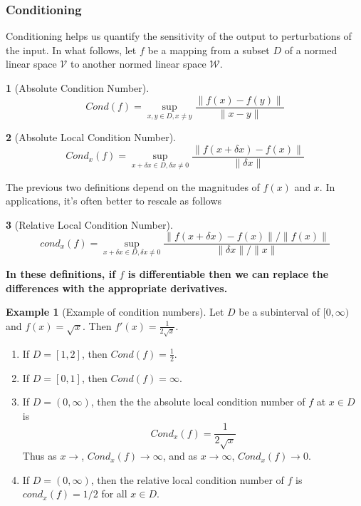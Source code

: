 \documentclass[12pt]{article}
\theoremstyle{definition}
\newtheorem{definition}{\color{NavyBlue}{\textbf{Definition}}}
\newcommand{\norm}[1]{\lVert#1\rVert}
\newtheorem{example}{\color{WildStrawberry}Example}
\theoremstyle{definition}
\begin{document}
\subsubsection{Conditioning}
Conditioning helps us quantify the sensitivity of the output to perturbations of the input. In what follows, let $f$ be a mapping from a subset $D$ of a normed linear space $\mathcal{V}$ to another normed linear space $\mathcal{W}$. 
\begin{definition}[Absolute Condition Number]
\begin{equation}
	Cond(f) = \sup_{x,y \in D, x\neq y} \frac{\norm{f(x) - f(y)}}{\norm{x - y}}
\end{equation}
\end{definition}

\begin{definition}[Absolute Local Condition Number]
\begin{equation}
	Cond_x(f) = \sup_{x + \delta x \in D, \delta x \neq 0} \frac{\norm{f(x + \delta x) - f(x)}}{\norm{\delta x}}
\end{equation}
\end{definition}

The previous two definitions depend on the magnitudes of $f(x)$ and $x$. In applications, it's often better to rescale as follows
\begin{definition}[Relative Local Condition Number]
\begin{equation}
	cond_x(f) = \sup_{x + \delta x \in D, \delta x \neq 0} \frac{\norm{f(x + \delta x) - f(x)} / \norm{f(x)}}{\norm{\delta x} / \norm{x}}
\end{equation}
\end{definition}

\textbf{In these definitions, if $f$ is differentiable then we can replace the differences with the appropriate derivatives.} 

\begin{example}[Example of condition numbers]
Let $D$ be a subinterval of $[0, \infty)$ and $f(x) = \sqrt{x}$. Then $f'(x) = \frac{1}{2 \sqrt{x}}$. 
\begin{enumerate}
	\item If $D = [1,2]$, then $Cond(f) = \frac{1}{2}$.
	\item If $D = [0, 1]$, then $Cond(f) = \infty$.
	\item If $D = (0, \infty)$, then the the absolute local condition number of $f$ at $x \in D$ is 
	\begin{equation}
		Cond_x(f) = \frac{1}{2 \sqrt{x}}
	\end{equation}
	Thus as $x \to $, $Cond_x(f) \to \infty$, and as $x \to \infty$, $Cond_x(f) \to 0$.
	\item If $D = (0, \infty)$, then the relative local condition number of $f$ is $cond_x(f) = 1/2$ for all $x \in D$. 
\end{enumerate}
\end{example}
\end{document}
